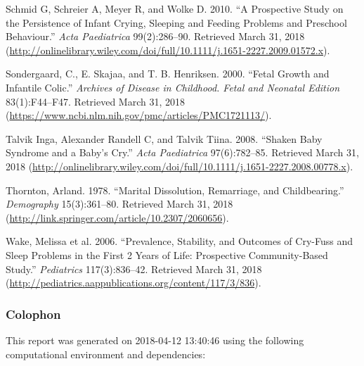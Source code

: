 \documentclass[]{article}
\begin{document}
\hypertarget{ref-schmid_g_prospective_2010}{}
Schmid G, Schreier A, Meyer R, and Wolke D. 2010. ``A Prospective Study
on the Persistence of Infant Crying, Sleeping and Feeding Problems and
Preschool Behaviour.'' \emph{Acta Paediatrica} 99(2):286--90. Retrieved
March 31, 2018
(\url{http://onlinelibrary.wiley.com/doi/full/10.1111/j.1651-2227.2009.01572.x}).

\hypertarget{ref-sondergaard_fetal_2000}{}
Sondergaard, C., E. Skajaa, and T. B. Henriksen. 2000. ``Fetal Growth
and Infantile Colic.'' \emph{Archives of Disease in Childhood. Fetal and
Neonatal Edition} 83(1):F44--F47. Retrieved March 31, 2018
(\url{https://www.ncbi.nlm.nih.gov/pmc/articles/PMC1721113/}).

\hypertarget{ref-talvik_inga_shaken_2008}{}
Talvik Inga, Alexander Randell C, and Talvik Tiina. 2008. ``Shaken Baby
Syndrome and a Baby's Cry.'' \emph{Acta Paediatrica} 97(6):782--85.
Retrieved March 31, 2018
(\url{http://onlinelibrary.wiley.com/doi/full/10.1111/j.1651-2227.2008.00778.x}).

\hypertarget{ref-thornton_marital_1978}{}
Thornton, Arland. 1978. ``Marital Dissolution, Remarriage, and
Childbearing.'' \emph{Demography} 15(3):361--80. Retrieved March 31,
2018 (\url{http://link.springer.com/article/10.2307/2060656}).

\hypertarget{ref-wake_prevalence_2006}{}
Wake, Melissa et al. 2006. ``Prevalence, Stability, and Outcomes of
Cry-Fuss and Sleep Problems in the First 2 Years of Life: Prospective
Community-Based Study.'' \emph{Pediatrics} 117(3):836--42. Retrieved
March 31, 2018
(\url{http://pediatrics.aappublications.org/content/117/3/836}).

\subsubsection{Colophon}\label{colophon}

This report was generated on 2018-04-12 13:40:46 using the following
computational environment and dependencies:
\end{document}
